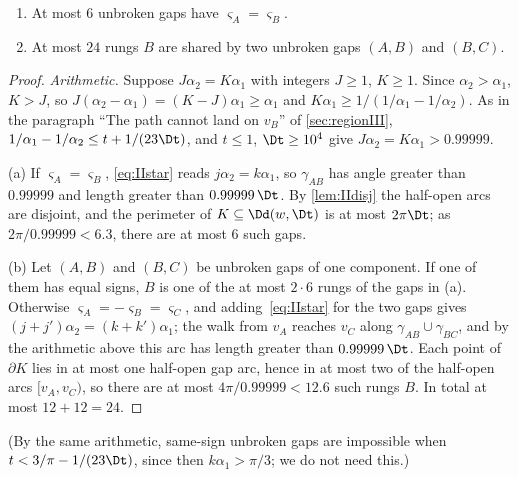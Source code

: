 \begin{lemma}\label{lem:IIcons}
\begin{enumerate}[label=\textup{(\alph*)}]
\item At most $6$ unbroken gaps have $\varsigma_A=\varsigma_B$.
\item At most $24$ rungs $B$ are shared by two unbroken gaps $(A,B)$ and $(B,C)$.
\end{enumerate}
\end{lemma}
\begin{proof}
\emph{Arithmetic.} Suppose $J\alpha_2=K\alpha_1$ with integers $J\ge1$, $K\ge1$. Since $\alpha_2>\alpha_1$, $K>J$, so $J(\alpha_2-\alpha_1)=(K-J)\alpha_1\ge\alpha_1$ and $K\alpha_1\ge1/(1/\alpha_1-1/\alpha_2)$. As in the paragraph ``The path cannot land on $v_B$'' of \cref{sec:regionIII}, $1/\alpha_1-1/\alpha_2\le t+1/(23\Dt)$, and $t\le1$, $\Dt\ge10^4$ give $J\alpha_2=K\alpha_1>0.99999$.

(a) If $\varsigma_A=\varsigma_B$, \eqref{eq:IIstar} reads $j\alpha_2=k\alpha_1$, so $\gamma_{AB}$ has angle greater than $0.99999$ and length greater than $0.99999\,\Dt$. By \cref{lem:IIdisj} the half-open arcs are disjoint, and the perimeter of $K\subseteq\Dd(w,\Dt)$ is at most $2\pi\Dt$; as $2\pi/0.99999<6.3$, there are at most $6$ such gaps.

(b) Let $(A,B)$ and $(B,C)$ be unbroken gaps of one component. If one of them has equal signs, $B$ is one of the at most $2\cdot6$ rungs of the gaps in (a). Otherwise $\varsigma_A=-\varsigma_B=\varsigma_C$, and adding~\eqref{eq:IIstar} for the two gaps gives $(j+j')\alpha_2=(k+k')\alpha_1$; the walk from $v_A$ reaches $v_C$ along $\gamma_{AB}\cup\gamma_{BC}$, and by the arithmetic above this arc has length greater than $0.99999\,\Dt$. Each point of $\partial K$ lies in at most one half-open gap arc, hence in at most two of the half-open arcs $[v_A,v_C)$, so there are at most $4\pi/0.99999<12.6$ such rungs $B$. In total at most $12+12=24$.
\end{proof}
(By the same arithmetic, same-sign unbroken gaps are impossible when $t<3/\pi-1/(23\Dt)$, since then $k\alpha_1>\pi/3$; we do not need this.)

